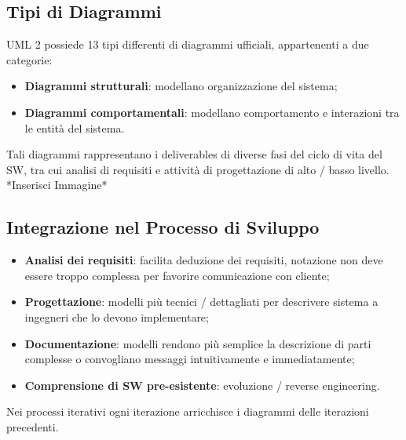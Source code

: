 \documentclass{article}
\begin{document}
    \subsection{Tipi di Diagrammi}
      UML 2 possiede 13 tipi differenti di diagrammi ufficiali, appartenenti a due categorie:
      \begin{itemize}
        \item \textbf{Diagrammi strutturali}: modellano organizzazione del sistema;
        \item \textbf{Diagrammi comportamentali}: modellano comportamento e interazioni tra le entità del sistema.
      \end{itemize}
      Tali diagrammi rappresentano i deliverables di diverse fasi del ciclo di vita del SW, tra cui analisi di requisiti e attività di progettazione di alto / basso livello. 
      *Inserisci Immagine*
    \subsection{Integrazione nel Processo di Sviluppo}
      \begin{itemize}
        \item \textbf{Analisi dei requisiti}: facilita deduzione dei requisiti, notazione non deve essere troppo complessa per favorire comunicazione con cliente;
        \item \textbf{Progettazione}: modelli più tecnici / dettagliati per descrivere sistema a ingegneri che lo devono implementare;
        \item \textbf{Documentazione}: modelli rendono più semplice la descrizione di parti complesse o convogliano messaggi intuitivamente e immediatamente;
        \item \textbf{Comprensione di SW pre-esistente}: evoluzione / reverse engineering.
      \end{itemize}
      Nei processi iterativi ogni iterazione arricchisce i diagrammi delle iterazioni precedenti.
\end{document}
